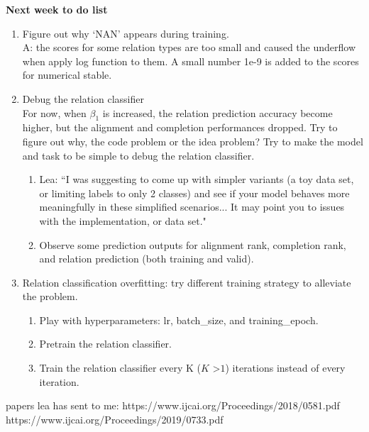\noindent\textbf{Next week to do list}
\begin{enumerate}
    \item \faCheckSquareO Figure out why `NAN' appears during training. \\
        A: the scores for some relation types are too small and caused the underflow when apply log function to them. A small number 1e-9 is added to the scores for numerical stable.
    \item Debug the relation classifier \\
    For now, when $\beta_1$ is increased, the relation prediction accuracy become higher, but the alignment and completion performances dropped.  Try to figure out why, the code problem or the idea problem?
    Try to make the model and task to be simple to debug the relation classifier. 
    \begin{enumerate}
        \item \faCheckSquareO Lea: ``I was suggesting to come up with simpler variants (a toy data set, or limiting labels to only 2 classes) and see if your model behaves more meaningfully in these simplified scenarios... It may point you to issues with the implementation, or data set."
        \item Observe some prediction outputs for alignment rank, completion rank, and relation prediction (both training and valid). 
    \end{enumerate}
    
    \item Relation classification overfitting: try different training strategy to alleviate the problem. 
    \begin{enumerate}
        \item \faCheckSquareO Play with hyperparameters: lr, batch\_size, and training\_epoch. 
        \item \faCheckSquareO Pretrain the relation classifier.
        \item \faCheckSquareO Train the relation classifier every K ($K$ \textgreater $1$) iterations instead of every iteration. 
    \end{enumerate}

\end{enumerate}
papers lea has sent to me:
https://www.ijcai.org/Proceedings/2018/0581.pdf
https://www.ijcai.org/Proceedings/2019/0733.pdf

